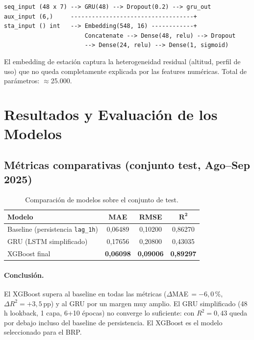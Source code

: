 \documentclass[12pt,a4paper]{article}
\begin{document}
\begin{lstlisting}
seq_input (48 x 7) --> GRU(48) --> Dropout(0.2) --> gru_out
aux_input (6,)     -----------------------------------+
sta_input () int   --> Embedding(548, 16) ------------+
                       Concatenate --> Dense(48, relu) --> Dropout
                       --> Dense(24, relu) --> Dense(1, sigmoid)
\end{lstlisting}

El embedding de estación captura la heterogeneidad residual (altitud, perfil de uso)
que no queda completamente explicada por las features numéricas. Total de parámetros: $\approx$25.000.

\section{Resultados y Evaluación de los Modelos}

\subsection{Métricas comparativas (conjunto test, Ago--Sep 2025)}

\begin{table}[H]
\centering
\caption{Comparación de modelos sobre el conjunto de test.}
\label{tab:metricas}
\begin{tabular}{lccc}
\toprule
\textbf{Modelo} & \textbf{MAE} & \textbf{RMSE} & $\boldsymbol{R^2}$ \\
\midrule
Baseline (persistencia \texttt{lag\_1h}) & 0,06489 & 0,10200 & 0,86270 \\
GRU (LSTM simplificado)                  & 0,17656 & 0,20800 & 0,43035 \\
\rowcolor{bestgreen}
XGBoost final                            & \textbf{0,06098} & \textbf{0,09006} & \textbf{0,89297} \\
\bottomrule
\end{tabular}
\end{table}

\paragraph{Conclusión.}
El XGBoost supera al baseline en todas las métricas ($\Delta$MAE\,$= -6{,}0\,\%$,
$\Delta R^2 = +3{,}5\,\text{pp}$) y al GRU por un margen muy amplio. El GRU
simplificado (48\,h lookback, 1 capa, 6+10 épocas) no converge lo suficiente:
con $R^2 = 0{,}43$ queda por debajo incluso del baseline de persistencia. El
XGBoost es el modelo seleccionado para el BRP.
\end{document}
